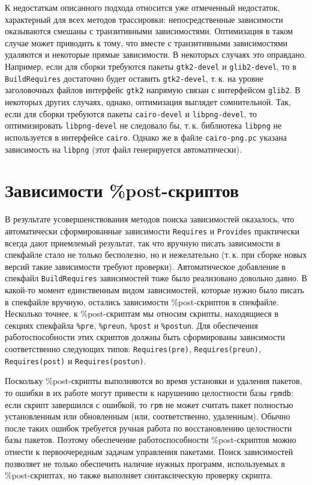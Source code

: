\documentclass[russian,a4paper,12pt,titlepage]{article}
\begin{document}
К недостаткам описанного подхода относится уже отмеченный недостаток, характерный для всех методов трассировки:
непосредственные зависимости оказываются смешаны с транзитивными зависимостями.  Оптимизация в таком случае
может приводить к тому, что вместе с транзитивными зависимостями удаляются и некоторые прямые зависимости.
В некоторых случаях это оправдано.  Например, если для сборки требуются пакеты \verb|gtk2-devel| и
\verb|glib2-devel|, то в \verb|BuildRequires| достаточно будет оставить \verb|gtk2-devel|, т.\,к. на уровне
заголовочных файлов интерфейс \verb|gtk2| напрямую связан с интерфейсом \verb|glib2|.  В некоторых других случаях,
однако, оптимизация выглядет сомнительной.  Так, если для сборки требуются пакеты \verb|cairo-devel| и \verb|libpng-devel|,
то оптимизировать \verb|libpng-devel| не следовало бы, т.\,к. библиотека \verb|libpng| не используется в интерфейсе \verb|cairo|.
Однако же в файле \verb|cairo-png.pc| указана зависимость на \verb|libpng| (этот файл генерируется автоматически).

\section{Зависимости \%post-скриптов}
\label{post-script-deps}
В результате усовершенствования методов поиска зависимостей оказалось, что автоматически сформированные
зависимости \verb|Requires| и \verb|Provides| практически всегда дают приемлемый результат, так что вручную
писать зависимости в спекфайле стало не только бесполезно, но и нежелательно (т.\,к. при сборке новых версий
такие зависимости требуют проверки).  Автоматическое добавление в спекфайл \verb|BuildRequires| зависимостей
тоже было реализовано довольно давно.  В какой-то момент единственным видом зависимостей, которые нужно было
писать в спекфайле вручную, остались зависимости \%post-скриптов в спекфайле.  Несколько точнее, к \%post-скриптам
мы относим скрипты, находящиеся в секциях спекфайла \verb|%pre|, \verb|%preun|, \verb|%post| и \verb|%postun|.
Для обеспечения работоспособности этих скриптов должны быть сформированы зависимости соответственно следующих
типов: \verb|Requires(pre)|, \verb|Requires(preun)|, \verb|Requires(post)| и \verb|Requires(postun)|.

Поскольку \%post-скрипты выполняются во время установки и удаления пакетов, то ошибки в их работе
могут привести к нарушению целостности базы \verb|rpmdb|: если скрипт завершился с ошибкой, то
\verb|rpm| не может считать пакет полностью установленным или обновленным (или, соответственно, удаленным).
Обычно после таких ошибок требуется ручная работа по восстановлению целостности базы пакетов.
Поэтому обеспечение работоспособности \%post-скриптов можно отнести к первоочередным задачам управления пакетами.
Поиск зависимостей позволяет не только обеспечить наличие нужных программ, используемых в \%post-скриптах,
но также выполняет синтаксическую проверку скрипта.
\end{document}
